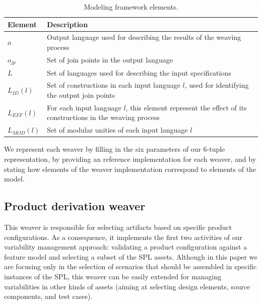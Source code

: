 \documentclass{report}
\begin{document}
\begin{frontmatter}
\begin{table}[h]
\begin{center}
\nocaptionrule \caption{Modeling framework elements.} \label{tab:tup-01}
\begin{tabular}{|p{0.6in}|p{2.4in}|}
  \hline
  {\bf Element} & {\bf Description} \\ 
   \hline
  $o$              & Output language used for describing the results of the weaving process \\ \hline
  $o_{jp}$       & Set of join points in the output language \\ \hline
  $L$              & Set of languages used for describing the input specifications \\ \hline
  $L_{ID}(l)$      & Set of constructions in each input language $l$, used for identifying the output join points \\ \hline 
  $L_{EFF}(l)$   & For each input language $l$, this element represent the effect of its constructions in the weaving process \\ \hline
  $L_{MOD}(l)$  & Set of modular unities of each input language $l$\\ \hline
  \hline
\end{tabular}
\end{center}
\end{table}

We represent each weaver by 
filling in the six parameters of our 6-tuple representation, by providing an reference implementation for each 
weaver, and by stating how elements of the weaver implementation correspond to elements of the model.

\subsection{Product derivation weaver}\label{sub:pd-weaver}

This weaver is responsible for selecting artifacts based on specific product configurations. 
As a consequence, it implements the first two activities of our variability management approach: 
validating a product configuration against  a feature model and selecting a subset of the SPL assets. 
Although in this paper we are focusing only in the selection of scenarios that should be assembled in specific instances 
of the SPL, this weaver can be easily extended for managing variabilities in other kinds of assets (aiming at selecting design elements, source components, and test cases). 


\end{frontmatter}
\end{document}
